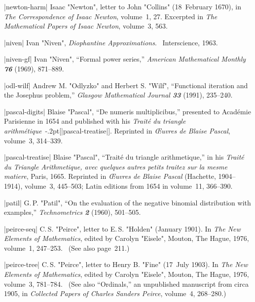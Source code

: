 \bib|newton-harm|%
Isaac "Newton", letter to John "Collins" (18~February 1670),
in {\sl The Correspondence of Isaac Newton},
volume~1, 27. %
Excerpted in {\sl The Mathematical Papers of Isaac Newton},
volume~3, 563. %

\bib|niven|%
Ivan "Niven", {\sl Diophantine Approximations}. \
Interscience, 1963.

\bib|niven-gf|%
Ivan "Niven", ``Formal power series,''
{\sl American Mathematical Monthly\/ \bf76} (1969), 871--889.

\bib|odl-wilf|%
Andrew M. "Odlyzko" and Herbert S. "Wilf", ``Functional iteration and the
Josephus problem,'' {\sl Glasgow Mathematical Journal\/ \bf33} (1991),
235--240.

\bib|pascal-digits|%
Blaise "Pascal", ``De numeris multiplicibus,'' presented to Acad\'emie
 Pari\-si\-enne in 1654 and published with his {\sl Trait\'e du
triangle arithm\'etique\/}~\kern-.2pt[|pascal-treatise|].
 Reprinted in {\sl \OE uvres de Blaise Pascal}, volume~3, 314--339.

\bib|pascal-treatise|%
Blaise "Pascal", ``Trait\'e du triangle arithmetique,'' in his
{\sl Trait\'e du Triangle Arithmetique, avec quelques autres petits
traitez sur la mesme matiere}, Paris, 1665. Reprinted
in {\sl \OE uvres de Blaise Pascal\/} (Hachette, 1904--1914), volume~3,
445--503; Latin editions from 1654 in volume~11, 366--390.

\bib|patil|%
G.\,P. "Patil", ``On the evaluation of the negative binomial distribution with
examples,'' {\sl Technometrics\/ \bf2} (1960), 501--505.

\bib|peirce-seq|%
C.\,S. "Peirce", letter to E.\,S. "Holden" (January 1901).
In {\sl The New Elements of Mathematics}, edited by Carolyn "Eisele",
Mouton, The Hague, 1976, volume~1, 247--253. \ (See also page~211.)

\bib|peirce-tree|%
C.\,S. "Peirce", letter to Henry B. "Fine" (17~July 1903).
In {\sl The New Elements of Mathematics}, edited by Carolyn "Eisele",
Mouton, The Hague, 1976, volume~3, 781--784. \ (See also ``Ordinals,''
an unpublished manuscript from circa 1905, in {\sl Collected Papers
of Charles Sanders Peirce}, %
volume~4, 268--280.)

